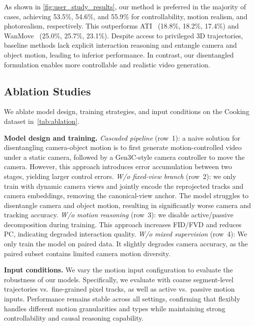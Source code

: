 As shown in \cref{fig:user_study_results}, our method is preferred in the majority of cases, achieving 53.5\%, 54.6\%, and 55.9\% for controllability, motion realism, and photorealism, respectively. This outperforms ATI~\cite{wang2025ati} (18.8\%, 18.2\%, 17.4\%) and WanMove~\cite{chu2025wanmove} (25.0\%, 25.7\%, 23.1\%). Despite access to privileged 3D trajectories, baseline methods lack explicit interaction reasoning and entangle camera and object motion, leading to inferior performance. In contrast, our disentangled formulation enables more controllable and realistic video generation.


\subsection{Ablation Studies}

We ablate model design, training strategies, and input conditions on the Cooking dataset in~\cref{tab:ablation}.

\noindent\textbf{Model design and training.}
\emph{Cascaded pipeline} (row~1): a naive solution for disentangling camera-object motion is to first generate motion-controlled video under a static camera, followed by a Gen3C-style camera controller to move the camera. However, this approach introduces error accumulation between two stages, yielding larger control errors.
\emph{W/o fixed-view branch} (row~2): we only train with dynamic camera views and jointly encode the reprojected tracks and camera embeddings, removing the canonical-view anchor.  The model struggles to disentangle camera and object motion, resulting in significantly worse camera and tracking accuracy.
\emph{W/o motion reasoning} (row~3): we disable active/passive decomposition during training. This approach increases FID/FVD and reduces PC, indicating degraded interaction quality.
\emph{W/o mixed supervision} (row~4): We only train the model on paired data. It slightly degrades camera accuracy, as the paired subset contains limited camera motion diversity.

\noindent\textbf{Input conditions.}
We vary the motion input configuration to evaluate the robustness of our models. Specifically, we evaluate with coarse segment-level trajectories vs.\ fine-grained pixel tracks, as well as active vs.\ passive motion inputs.
Performance remains stable across all settings, confirming that \ours flexibly handles different motion granularities and types while maintaining strong controllability and causal reasoning capability.


